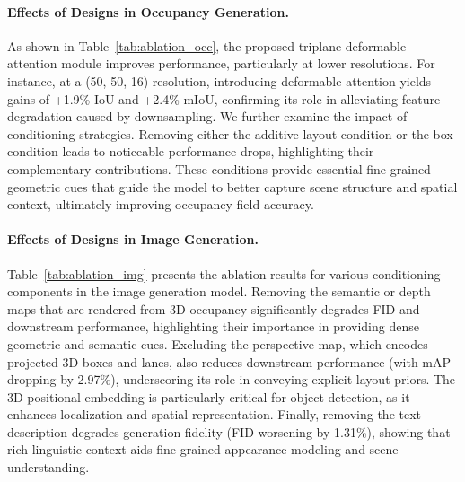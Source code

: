 \paragraph{Effects of Designs in Occupancy Generation.}
As shown in Table~\ref{tab:ablation_occ}, the proposed triplane deformable attention module improves performance, particularly at lower resolutions. For instance, at a (50, 50, 16) resolution, introducing deformable attention yields gains of +1.9\% IoU and +2.4\% mIoU, confirming its role in alleviating feature degradation caused by downsampling.
We further examine the impact of conditioning strategies. Removing either the additive layout condition or the box condition leads to noticeable performance drops, highlighting their complementary contributions. These conditions provide essential fine-grained geometric cues that guide the model to better capture scene structure and spatial context, ultimately improving occupancy field accuracy.

\paragraph{Effects of Designs in Image Generation.}
Table~\ref{tab:ablation_img} presents the ablation results for various conditioning components in the image generation model. Removing the semantic or depth maps that are rendered from 3D occupancy significantly degrades FID and downstream performance, highlighting their importance in providing dense geometric and semantic cues. Excluding the perspective map, which encodes projected 3D boxes and lanes, also reduces downstream performance (with mAP dropping by 2.97\%), underscoring its role in conveying explicit layout priors. The 3D positional embedding is particularly critical for object detection, as it enhances localization and spatial representation. Finally, removing the text description degrades generation fidelity (FID worsening by 1.31\%), showing that rich linguistic context aids fine-grained appearance modeling and scene understanding.


